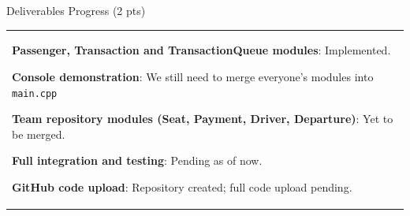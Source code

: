 \documentclass[12pt,a4paper]{article}
\newcommand{\sectiontitle}[1]{%
    {\color{GEUBlue}
    \fontsize{18}{22}\selectfont #1}
}
\newcommand{\instruction}[1]{%
    {\color{InstructionGrey}
    \fontsize{10.5}{13}\selectfont #1}
}
\newcommand{\answerbox}[2]{%
    \begin{tabularx}{\textwidth}{
        |>{\raggedright\arraybackslash}X|}
        \hline
        \parbox[t][#1][t]{\dimexpr\linewidth-12pt\relax}{
            \vspace{5pt}
            \fontsize{11}{13}\selectfont #2
        }\\
        \hline
    \end{tabularx}
}
\begin{document}
\vspace{0.65cm}

\sectiontitle{Deliverables Progress (2 pts)}

\vspace{0.05cm}


\vspace{0.25cm}

\answerbox{3.0cm}{\textbf{Passenger, Transaction and TransactionQueue modules}: Implemented.

\textbf{Console demonstration}: We still need to merge everyone's modules into \texttt{main.cpp}

\textbf{Team repository modules (Seat, Payment, Driver, Departure)}: Yet to be merged.

\textbf{Full integration and testing}: Pending as of now.

\textbf{GitHub code upload}: Repository created; full code upload pending.}
\end{document}

